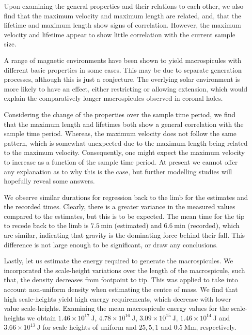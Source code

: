 Upon examining the general properties and their relations to each other, we also find that the maximum velocity and maximum length are related, and, that the lifetime and maximum length show signs of correlation. However, the maximum velocity and lifetime appear to show little correlation with the current sample size.

A range of magnetic environments have been shown to yield macrospicules with different basic properties in some cases. This may be due to separate generation processes, although this is just a conjecture. The overlying solar environment is more likely to have an effect, either restricting or allowing extension, which would explain the comparatively longer macrospicules observed in coronal holes.

Considering the change of the properties over the sample time period, we find that the maximum length and lifetimes both show a general correlation with the sample time period. Whereas, the maximum velocity does not follow the same pattern, which is somewhat unexpected due to the maximum length being related to the maximum velocity. Consequently, one might expect the maximum velocity to increase as a function of the sample time period. At present we cannot offer any explanation as to why this is the case, but further modelling studies will hopefully reveal some answers.

We observe similar durations for regression back to the limb for the estimates and the recorded times. Clearly, there is a greater variance in the measured values compared to the estimates, but this is to be expected. The mean time for the tip to recede back to the limb is $7.5\ \textrm{min}$ (estimated) and $6.6\ \textrm{min}$ (recorded), which are similar, indicating that gravity is the dominating force behind their fall. This difference is not large enough to be significant, or draw any conclusions.

Lastly, let us estimate the energy required to generate the macrospicules. We incorporated the scale-height variations over the length of the macrospicule, such that, the density decreases from footpoint to tip. This was applied to take into account non-uniform density when estimating the centre of mass. We find that high scale-heights yield high energy requirements, which decrease with lower value scale-heights. Examining the mean macrospicule energy values for the scale-heights we obtain $1.46 \times 10^{17}\ \textrm{J}$, $4.78 \times 10^{16}\ \textrm{J}$,  $3.09 \times 10^{15}\ \textrm{J}$, $1.46 \times 10^{14}\ \textrm{J}$ and $3.66 \times 10^{13}\ \textrm{J}$ for scale-heights of uniform and $25, 5, 1$ and $0.5\ \textrm{Mm}$, respectively.


